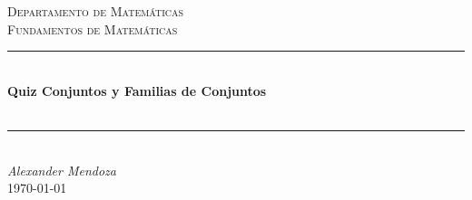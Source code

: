 \documentclass[11pt]{article}
\begin{document}
    \begin{titlepage}

        \newcommand{\HRule}{\rule{\linewidth}{0.5mm}}
        \newcommand{\department}{Departamento de Matemáticas}
        \newcommand{\course}{Fundamentos de Matemáticas}
        \newcommand{\titleValue}{Quiz Conjuntos y Familias de Conjuntos}
        \newcommand{\subtitleValue}{}
        \newcommand{\authorName}{Alexander Mendoza}

        \center


        \vspace{0.5cm}
        \textsc{\Large \department}\\[0.5cm]
        \textsc{\Large \course}\\[0.5cm]
        \vfill


        \HRule\\
        \Huge
        \textbf{\titleValue}\\[0.5cm]
        \Large
        \textbf{\subtitleValue}\\
        \HRule\\[0.5cm]


        \vfill
        \Large
        \textit{\authorName}\\
        {\large \today}\\[2cm]

    \end{titlepage}
\end{document}
